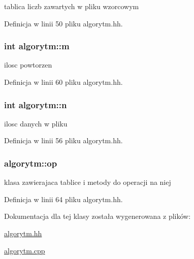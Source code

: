tablica liczb zawartych w pliku wzorcowym 



Definicja w linii 50 pliku algorytm.\-hh.

\hypertarget{classalgorytm_ac9429e88b0630a008df4d011458ee5a2}{
\subsubsection[{m}]{\setlength{\rightskip}{0pt plus 5cm}int algorytm\-::m\hspace{0.3cm}{\ttfamily [protected]}}}\label{classalgorytm_ac9429e88b0630a008df4d011458ee5a2}


ilosc powtorzen 



Definicja w linii 60 pliku algorytm.\-hh.

\hypertarget{classalgorytm_a2778c37f0ec06a30b7d494501c40e91a}{
\subsubsection[{n}]{\setlength{\rightskip}{0pt plus 5cm}int algorytm\-::n\hspace{0.3cm}{\ttfamily [protected]}}}\label{classalgorytm_a2778c37f0ec06a30b7d494501c40e91a}


ilosc danych w pliku 



Definicja w linii 56 pliku algorytm.\-hh.

\hypertarget{classalgorytm_aedaee1aa41206b5f050fe660d0846f2d}{
\subsubsection[{op}]{ algorytm\-::op\hspace{0.3cm}{\ttfamily [protected]}}}\label{classalgorytm_aedaee1aa41206b5f050fe660d0846f2d}


klasa zawierajaca tablice i metody do operacji na niej 



Definicja w linii 64 pliku algorytm.\-hh.



Dokumentacja dla tej klasy została wygenerowana z plików\-:\begin{DoxyCompactItemize}
\item 
\hyperlink{algorytm_8hh}{algorytm.\-hh}\item 
\hyperlink{algorytm_8cpp}{algorytm.\-cpp}\end{DoxyCompactItemize}
